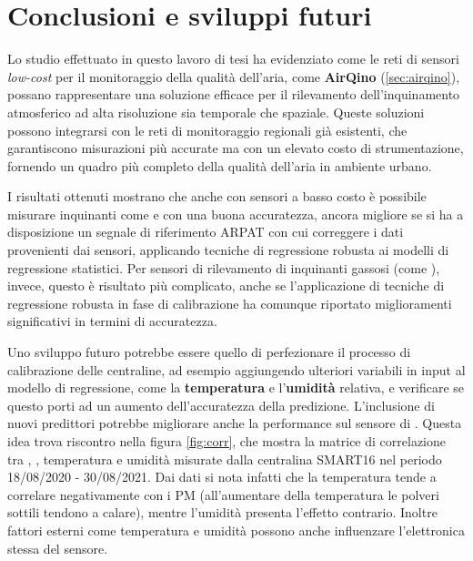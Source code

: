 \chapter*{Conclusioni e sviluppi futuri}\label{ch:conclusioni}
Lo studio effettuato in questo lavoro di tesi ha evidenziato come le reti di sensori \textit{low-cost} per il monitoraggio della qualità dell'aria, come \textbf{AirQino} (\ref{sec:airqino}), possano rappresentare una soluzione efficace per il rilevamento dell'inquinamento atmosferico ad alta risoluzione sia temporale che spaziale. Queste soluzioni possono integrarsi con le reti di monitoraggio regionali già esistenti, che garantiscono misurazioni più accurate ma con un elevato costo di strumentazione, fornendo un quadro più completo della qualità dell'aria in ambiente urbano.

I risultati ottenuti mostrano che anche con sensori a basso costo è possibile misurare inquinanti come  e  con una buona accuratezza, ancora migliore se si ha a disposizione un segnale di riferimento ARPAT con cui correggere i dati provenienti dai sensori, applicando tecniche di regressione robusta ai modelli di regressione statistici. Per sensori di rilevamento di inquinanti gassosi (come ), invece, questo è risultato più complicato, anche se l'applicazione di tecniche di regressione robusta in fase di calibrazione ha comunque riportato miglioramenti significativi in termini di accuratezza.

Uno sviluppo futuro potrebbe essere quello di perfezionare il processo di calibrazione delle centraline, ad esempio aggiungendo ulteriori variabili in input al modello di regressione, come la \textbf{temperatura} e l'\textbf{umidità} relativa, e verificare se questo porti ad un aumento dell'accuratezza della predizione. L'inclusione di nuovi predittori potrebbe migliorare anche la performance sul sensore di .
 Questa idea trova riscontro nella figura \ref{fig:corr}, che mostra la matrice di correlazione tra , , temperatura e umidità misurate dalla centralina SMART16 nel periodo 18/08/2020 - 30/08/2021. Dai dati si nota infatti che la temperatura tende a correlare negativamente con i PM (all'aumentare della temperatura le polveri sottili tendono a calare), mentre l'umidità presenta l'effetto contrario. Inoltre fattori esterni come temperatura e umidità possono anche influenzare l'elettronica stessa del sensore.

